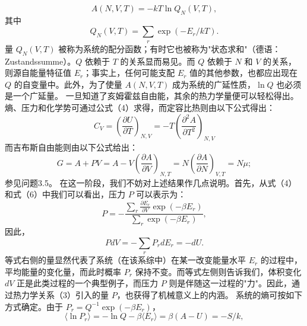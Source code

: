 \begin{equation}\tag{3.3.7}\label{eq:3.3.7}
A ( N , V , T ) = - k T \ln Q _ { N } ( V , T ) ,
\end{equation}
其中
\begin{equation}\tag{3.3.8}\label{eq:3.3.8}
Q _ { N } ( V , T ) = \sum _ { r } \exp ( - E _ { r } / k T ) .
\end{equation}
量 \(Q_{N}(V,T)\) 被称为系统的配分函数；有时它也被称为"状态求和"（德语：Zustandssumme）。\(Q\) 依赖于 \(T\) 的关系显而易见。而 \(Q\) 依赖于 \(N\) 和 \(V\) 的关系，则源自能量特征值 \(E_{r}\)；事实上，任何可能支配 \(E_{r}\) 值的其他参数，也都应出现在 \(Q\) 的自变量中。此外，为了使量 \(A(N,V,T)\) 成为系统的广延性质，\(\ln Q\) 也必须是一个广延量。
一旦知道了亥姆霍兹自由能，其余的热力学量便可以轻松得出。熵、压力和化学势可通过公式（4）求得，而定容比热则由以下公式得出：
\begin{equation}\tag{3.3.9}\label{eq:3.3.9}
C _ { V } = \left( \frac { \partial U } { \partial T } \right) _ { N , V } = - T \left( \frac { \partial ^{2} A } { \partial T ^{2} } \right) _ { N , V }
\end{equation}
而吉布斯自由能则由以下公式给出：
\begin{equation}\tag{3.3.10}\label{eq:3.3.10}
G = A + P V = A - V \left( { \frac { \partial A } { \partial V } } \right) _ { N , T } = N \left( { \frac { \partial A } { \partial N } } \right) _ { V , T } = N \mu ;
\end{equation}
参见问题3.5。
在这一阶段，我们不妨对上述结果作几点说明。首先，从式（4）和式（6）中我们可以看出，压力 \(P\) 可以表示为：
\begin{equation}\tag{3.3.11}\label{eq:3.3.11}
P = - \frac { \sum _ { r } \frac { \partial E _ { r } } { \partial V } \exp ( - \beta E _ { r } ) } { \sum _ { r } \exp ( - \beta E _ { r } ) } ,
\end{equation}
因此，
\begin{equation}\tag{3.3.12}\label{eq:3.3.12}
P d V = - \sum _ { r } P _ { r } d E _ { r } = - d U .
\end{equation}
等式右侧的量显然代表了系统（在该系综中）在某一改变能量水平 \(E_{r}\) 的过程中，平均能量的变化量，而此时概率 \(P_{r}\) 保持不变。而等式左侧则告诉我们，体积变化 \(dV\) 正是此类过程的一个典型例子，而压力 \(P\) 则是伴随这一过程的"力"。因此，通过热力学关系（3）引入的量 \(P\)，也获得了机械意义上的内涵。
系统的熵可按如下方式确定。由于 \(P_{r}=Q^{-1}\exp(-\beta E_{r})\)，
\begin{equation}\tag{3.3.13}\label{eq:3.3.13}
\langle \ln P _ { r } \rangle = - \ln Q - \beta \langle E _ { r } \rangle = \beta ( A - U ) = - S / k ,
\end{equation}
